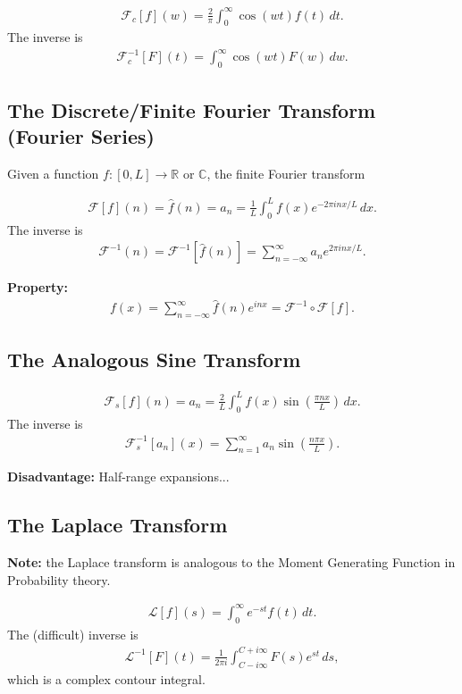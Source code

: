 \documentclass{book}
\theoremstyle{definition}
\newcommand{\R}{\mathbb{R}}
\newcommand{\lag}{\mathcal{L}}
\newcommand{\F}{\mathcal{F}}
\begin{document}
\begin{align*}
\F_c[f](w) = \frac{2}{\pi}\int^\infty_{0}\cos(wt)f(t)\,dt.
\end{align*}
The inverse is
\begin{align*}
\F^{-1}_c[F](t) = \int_{0}^\infty\cos(wt)F(w)\,dw.
\end{align*}

\subsection{The Discrete/Finite Fourier Transform (Fourier Series)}

Given a function $f : [0,L] \to \R$ or $\mathbb{C}$, the finite Fourier transform

\begin{align*}
\F[f](n) = \hat{f}(n) = a_n = \frac{1}{L}\int^L_0 f(x)e^{-2\pi inx/L}\,dx.
\end{align*}
The inverse is
\begin{align*}
\F^{-1}(n) = \F^{-1}[\hat{f}(n)] = \sum^\infty_{n=-\infty} a_n e^{2\pi inx/L}. 
\end{align*}

\textbf{Property:}
\begin{align*}
f(x) = \sum^\infty_{n=-\infty} \hat{f}(n)e^{inx} = \F^{-1}\circ \F[f].
\end{align*} 

\subsection{The Analogous Sine Transform}


\begin{align*}
\F_s[f](n) = a_n = \frac{2}{L}\int^L_0 f(x)\sin\left(\frac{\pi nx}{L}\right)\,dx.
\end{align*}
The inverse is
\begin{align*}
\F^{-1}_s[a_n](x) = \sum^\infty_{n=1}a_n \sin\left(\frac{n\pi x}{L}\right).
\end{align*}

\textbf{Disadvantage:} Half-range expansions...

\subsection{The Laplace Transform}

\textbf{Note:} the Laplace transform is analogous to the Moment Generating Function in Probability theory. 

\begin{align*}
\lag[f](s) = \int^\infty_0 e^{-st}f(t)\,dt.
\end{align*}
The (difficult) inverse is
\begin{align*}
\lag^{-1}[F](t) = \frac{1}{2\pi i} \int^{C+i\infty}_{C-i\infty}F(s)e^{st}\,ds,
\end{align*}
which is a complex contour integral.\\
\end{document}
